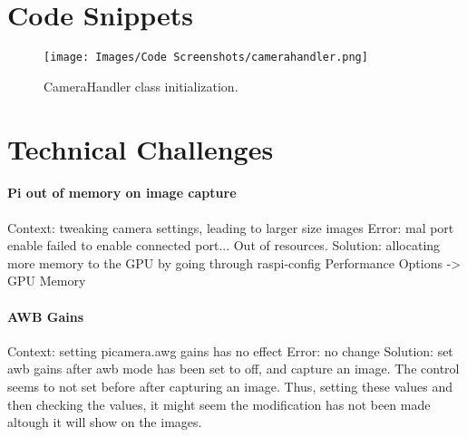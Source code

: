 \appendix
\section{Code Snippets}
\label{app:code_snippets}
\begin{figure}[H]
	\centering
	\texttt{[image: Images/Code Screenshots/camerahandler.png]}
	\caption{CameraHandler class initialization.}
	\label{fig:code_camerahandler}
\end{figure}

\section{Technical Challenges}
\paragraph{Pi out of memory on image capture}
Context: tweaking camera settings, leading to larger size images
Error: mal port enable failed to enable connected port... Out of resources.
Solution: allocating more memory to the GPU by going through raspi-config Performance Options -> GPU Memory

\paragraph{AWB Gains}
Context: setting picamera.awg gains has no effect
Error: no change
Solution: set awb gains after awb mode has been set to off, and capture an image. The control seems to not set before after capturing an image. Thus, setting these values and then checking the values, it might seem the modification has not been made altough it will show on the images.

